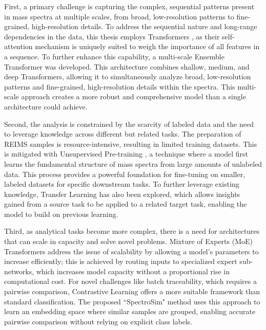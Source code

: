 First, a primary challenge is capturing the complex, sequential patterns present in mass spectra at multiple scales, from broad, low-resolution patterns to fine-grained, high-resolution details. To address the sequential nature and long-range dependencies in the data, this thesis employs
Transformers \citep{Vaswani2017}, as their self-attention mechanism is uniquely suited to weigh the importance of all features in a sequence. To further enhance this capability, a multi-scale
Ensemble Transformer \citep{Wolpert1992} was developed. This architecture combines shallow, medium, and deep Transformers, allowing it to simultaneously analyze broad, low-resolution patterns and fine-grained, high-resolution details within the spectra. This multi-scale approach creates a more robust and comprehensive model than a single architecture could achieve.

Second, the analysis is constrained by the scarcity of labeled data and the need to leverage knowledge across different but related tasks. The preparation of REIMS samples is resource-intensive, resulting in limited training datasets. This is mitigated with
Unsupervised Pre-training \citep{Devlin2018}, a technique where a model first learns the fundamental structure of mass spectra from large amounts of unlabeled data. This process provides a powerful foundation for fine-tuning on smaller, labeled datasets for specific downstream tasks. To further leverage existing knowledge,
Transfer Learning \citep{Bozinovski1976,Tan2018} has also been explored, which allows insights gained from a source task to be applied to a related target task, enabling the model to build on previous learning.

Third, as analytical tasks become more complex, there is a need for architectures that can scale in capacity and solve novel problems.
Mixture of Experts (MoE) Transformers \citep{Jacobs1991,Kaiser2017} address the issue of scalability by allowing a model’s parameters to increase efficiently; this is achieved by routing inputs to specialized expert sub-networks, which increases model capacity without a proportional rise in computational cost. For novel challenges like batch traceability, which requires a pairwise comparison,
Contrastive Learning \citep{Chen2020a} offers a more suitable framework than standard classification. The proposed ``SpectroSim" method uses this approach to learn an embedding space where similar samples are grouped, enabling accurate pairwise comparison without relying on explicit class labels.


